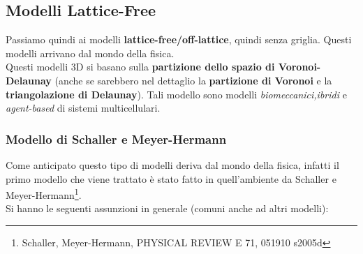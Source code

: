 \documentclass[a4paper,12pt, oneside]{book}
\begin{document}
\subsection{Modelli Lattice-Free}
Passiamo quindi ai modelli \textbf{lattice-free/off-lattice}, quindi senza
griglia. Questi modelli arrivano dal mondo della fisica.\\
Questi modelli 3D si basano sulla \textbf{partizione dello spazio di
  Voronoi-Delaunay} (anche se sarebbero nel dettaglio la \textbf{partizione di
  Voronoi} e la \textbf{triangolazione di Delaunay}). Tali modello sono modelli
\textit{biomeccanici,ibridi} e \textit{agent-based} di sistemi multicellulari.
\subsubsection{Modello di Schaller e Meyer-Hermann}
Come anticipato questo tipo di modelli deriva dal mondo della fisica, infatti il
primo modello che viene trattato è stato fatto in quell'ambiente da  Schaller e
Meyer-Hermann\footnote{Schaller, Meyer-Hermann, PHYSICAL REVIEW E 71, 051910
  s2005d}. \\
Si hanno le seguenti assunzioni in generale (comuni anche ad altri modelli): 
\end{document}
